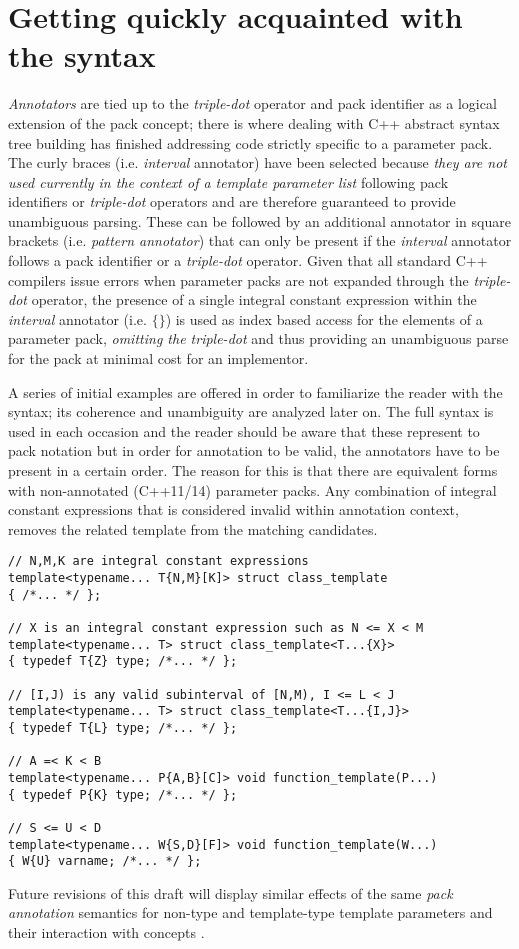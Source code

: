 \section{Getting quickly acquainted with the syntax}
\p \textit{Annotators} are tied up to the \textit{triple-dot} operator and pack identifier as a logical extension of the pack concept; there is where dealing with C++ abstract syntax tree building has finished addressing code strictly specific to a parameter pack.
The curly braces (i.e. \textit{interval} annotator) have been selected because \textit{they are not used currently in the context of a template parameter list} following pack identifiers or \textit{triple-dot} operators and are therefore guaranteed to provide unambiguous parsing.
These can be followed by an additional annotator in square brackets (i.e. \textit{pattern annotator}) that can only be present if the \textit{interval} annotator follows a pack identifier or a \textit{triple-dot} operator.
Given that all standard C++ compilers issue errors when parameter packs are not expanded through the \textit{triple-dot} operator, the presence of a single integral constant expression within the \textit{interval} annotator (i.e. $\{\}$) is used as index based access for the elements of a parameter pack, \textit{omitting the triple-dot} and thus providing an unambiguous parse for the pack at minimal cost for an implementor.

\p A series of initial examples are offered in order to familiarize the reader with the syntax; its coherence and unambiguity are analyzed later on.
The full syntax is used in each occasion and the reader should be aware that these represent  to pack notation but in order for annotation to be valid, the annotators have to be present in a certain order.
The reason for this is that there are equivalent forms with non-annotated (C++11/14) parameter packs.
Any combination of integral constant expressions that is considered invalid within annotation context, removes the related template from the matching candidates.

\begin{verbatim}
// N,M,K are integral constant expressions
template<typename... T{N,M}[K]> struct class_template
{ /*... */ };

// X is an integral constant expression such as N <= X < M
template<typename... T> struct class_template<T...{X}>
{ typedef T{Z} type; /*... */ };

// [I,J) is any valid subinterval of [N,M), I <= L < J
template<typename... T> struct class_template<T...{I,J}>
{ typedef T{L} type; /*... */ };

// A =< K < B
template<typename... P{A,B}[C]> void function_template(P...)
{ typedef P{K} type; /*... */ };

// S <= U < D
template<typename... W{S,D}[F]> void function_template(W...)
{ W{U} varname; /*... */ };

\end{verbatim}

\p Future revisions of this draft will display similar effects of the same \textit{pack annotation} semantics for non-type and template-type template parameters and their interaction with concepts \cite{Stroustrup2012,Sutton2013}.


